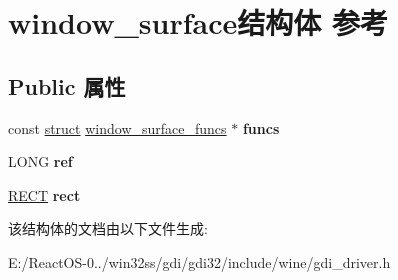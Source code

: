 \hypertarget{structwindow__surface}{}\section{window\+\_\+surface结构体 参考}
\label{structwindow__surface}
\subsection*{Public 属性}
\begin{DoxyCompactItemize}
\item 
\mbox{\label{structwindow__surface_a48410d3b1c707805bae4d673737440d3}} 
const \hyperlink{interfacestruct}{struct} \hyperlink{structwindow__surface__funcs}{window\+\_\+surface\+\_\+funcs} $\ast$ {\bfseries funcs}
\item 
\mbox{\label{structwindow__surface_a90718fc1c1d835baf392059133144c96}} 
L\+O\+NG {\bfseries ref}
\item 
\mbox{\label{structwindow__surface_aa8dcb8672a4d48c9b1cddea16bfbc7fd}} 
\hyperlink{structtag_r_e_c_t}{R\+E\+CT} {\bfseries rect}
\end{DoxyCompactItemize}


该结构体的文档由以下文件生成\+:\begin{DoxyCompactItemize}
\item 
E\+:/\+React\+O\+S-\/0../win32ss/gdi/gdi32/include/wine/gdi\+\_\+driver.\+h\end{DoxyCompactItemize}
